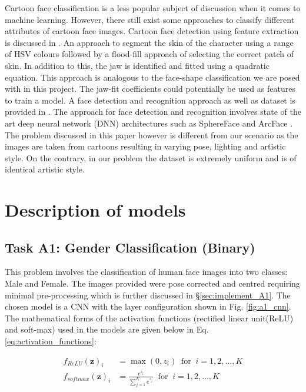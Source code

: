 \documentclass{article}
\begin{document}
    Cartoon face classification is a less popular subject of discussion when it comes to machine learning. However, there still exist some approaches to classify different attributes of cartoon face images. Cartoon face detection using feature extraction is discussed in \autocite{takayama_2012}. An approach to segment the skin of the character using a range of HSV colours followed by a flood-fill approach of selecting the correct patch of skin. In addition to this, the jaw is identified and fitted using a quadratic equation. This approach is analogous to the face-shape classification we are posed with in this project. The jaw-fit coefficients could potentially be used as features to train a model. A face detection and recognition approach as well as dataset is provided in \autocite{1907_13394}. The approach for face detection and recognition involves state of the art deep neural network (DNN) architectures such as SphereFace \autocite{8100196} and ArcFace \autocite{8953658}. The problem discussed in this paper however is different from our scenario as the images are taken from cartoons resulting in varying pose, lighting and artistic style. On the contrary, in our problem the dataset is extremely uniform and is of identical artistic style.


\section{Description of models}
\label{sec:description_of_models}
    \subsection{Task A1: Gender Classification (Binary)}
    \label{sec:desc_A1}
    
	    This problem involves the classification of human face images into two classes: Male and Female. The images provided were pose corrected and centred requiring minimal pre-processing which is further discussed in \S \ref{sec:implement_A1}. The chosen model is a CNN with the layer configuration shown in Fig. \ref{fig:a1_cnn}. The mathematical forms of the activation functions (rectified linear unit(ReLU) and soft-max) used in the models are given below in Eq. \ref{eq:activation_functions}:
	    
	    \begin{equation}
	    	\label{eq:activation_functions}
	    	\begin{split}
	    		f_{ReLU}(\boldsymbol{z})_i &= \max(0,z_i) \;\; \text{for} \;\;  i = 1, 2, \dots , K\\
	    		f_{softmax}(\boldsymbol{z})_i &= \frac{e^{z_i}}{\sum_{j=1}^{K}e^{z_j}} \;\; \text{for} \;\;  i = 1, 2, \dots , K
	    	\end{split}
	    \end{equation}
	    
\end{document}
